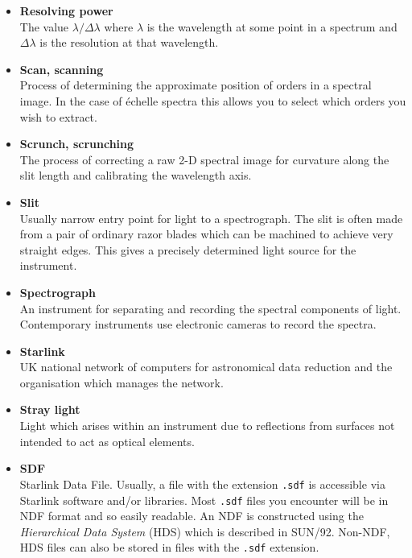 \documentclass[twoside,11pt]{article}
\newcommand{\htmlref}[2]{#1}
\newcommand{\xref}[3]{#1}
\begin{document}
\begin{itemize}
\item {\bf\label{gl_resolving_power}Resolving power}\\
      The value $\lambda/\Delta\lambda$ where $\lambda$ is the wavelength
      at some point in a spectrum and $\Delta\lambda$ is the resolution
      at that wavelength.

\item {\bf\label{gl_scanning}Scan, scanning}\\
      Process of determining the approximate position of orders in a
      spectral image.  In the case of \'{e}chelle spectra this allows
      you to select which orders you wish to extract.

\item {\bf\label{gl_scrunch}Scrunch, scrunching}\\
      The process of correcting a raw 2-D spectral image for curvature
      along the slit length and calibrating the wavelength axis.

\item {\bf\label{gl_slit}Slit}\\
      Usually narrow entry point for light to a spectrograph.
      The slit is often made from a pair of ordinary razor blades which can
      be machined to achieve very straight edges.  This gives a precisely
      determined light source for the instrument.

\item {\bf\label{gl_spectrograph}Spectrograph}\\
      An instrument for separating and recording the spectral components of
      light.  Contemporary instruments use electronic cameras to record the
      spectra.

\item {\bf\label{gl_starlink}Starlink}\\
      UK national network of computers for astronomical data reduction
      and the organisation which manages the network.

\item {\bf\label{gl_stray_light}Stray light}\\
      Light which arises within an instrument due to reflections from
      surfaces not intended to act as optical elements.

\item {\bf\label{gl_sdf}SDF}\\
      Starlink Data File.  Usually, a file with the extension \verb+.sdf+
      is accessible via Starlink software and/or libraries.
      Most \verb+.sdf+ files you encounter will be in \htmlref{NDF}{gl_ndf}
      format and so easily readable.  An NDF is constructed using the
      {\sl Hierarchical Data System} (HDS) which is described in
      \xref{SUN/92}{sun92}{}\cite{hds}.
      Non-NDF, HDS files can also be stored in
      files with the \verb+.sdf+ extension.


\end{itemize}
\end{document}
